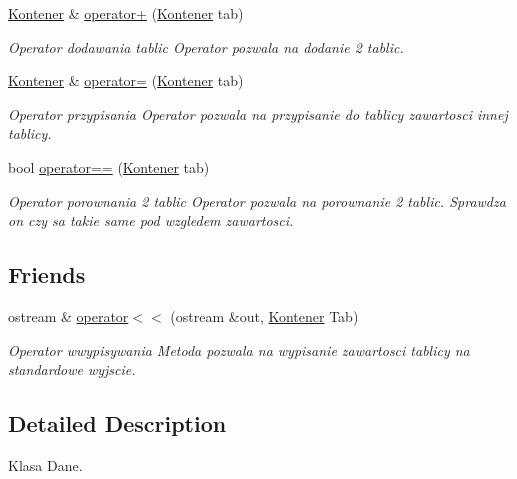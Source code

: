 \begin{DoxyCompactItemize}
\item 
\hyperlink{class_kontener}{Kontener} \& \hyperlink{class_kontener_abff1153212b0544baed9f7081e16e0de}{operator+} (\hyperlink{class_kontener}{Kontener} tab)
\begin{DoxyCompactList}\small\item\em Operator dodawania tablic Operator pozwala na dodanie 2 tablic. \end{DoxyCompactList}\item 
\hyperlink{class_kontener}{Kontener} \& \hyperlink{class_kontener_a980caf091a2263e759d1c14f5239cafb}{operator=} (\hyperlink{class_kontener}{Kontener} tab)
\begin{DoxyCompactList}\small\item\em Operator przypisania Operator pozwala na przypisanie do tablicy zawartosci innej tablicy. \end{DoxyCompactList}\item 
bool \hyperlink{class_kontener_a4d8165d3e222bdc09e9ab85aed8a3dee}{operator==} (\hyperlink{class_kontener}{Kontener} tab)
\begin{DoxyCompactList}\small\item\em Operator porownania 2 tablic Operator pozwala na porownanie 2 tablic. Sprawdza on czy sa takie same pod wzgledem zawartosci. \end{DoxyCompactList}\end{DoxyCompactItemize}
\subsection*{Friends}
\begin{DoxyCompactItemize}
\item 
\hypertarget{class_kontener_a5a67000814e6c94f572b5d68fea39c01}{ostream \& \hyperlink{class_kontener_a5a67000814e6c94f572b5d68fea39c01}{operator$<$$<$} (ostream \&out, \hyperlink{class_kontener}{Kontener} Tab)}\label{class_kontener_a5a67000814e6c94f572b5d68fea39c01}

\begin{DoxyCompactList}\small\item\em Operator wwypisywania Metoda pozwala na wypisanie zawartosci tablicy na standardowe wyjscie. \end{DoxyCompactList}\end{DoxyCompactItemize}


\subsection{Detailed Description}
Klasa Dane. 

